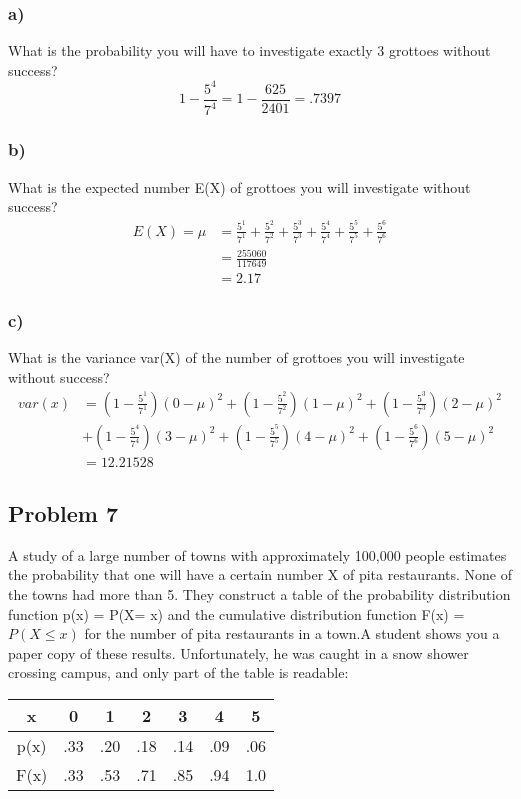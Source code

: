 \documentclass{article}
\begin{document}
\subsubsection*{a)}
What is the probability you will have to investigate exactly 3 grottoes without success?
\begin{equation}
    1 - \frac{5^{4}}{7^{4}} = 1 - \frac{625}{2401} = .7397
\end{equation}
\subsubsection*{b)}
What is the expected number E(X) of grottoes you will investigate without success?
\begin{align}
    E(X) = \mu &= \frac{5^{1}}{7^{1}} + \frac{5^{2}}{7^{2}} + \frac{5^{3}}{7^{3}} + \frac{5^{4}}{7^{4}} + \frac{5^{5}}{7^{5}} + \frac{5^{6}}{7^{6}}\\
    &= \frac{255060}{117649}\\
    &= 2.17
\end{align}
\subsubsection*{c)}
What is the variance var(X) of the number of grottoes you will investigate without success?
\begin{align}
    var(x) &= (1 - \frac{5^{1}}{7^{1}})(0-\mu)^2 +  (1 - \frac{5^{2}}{7^{2}})(1-\mu)^2 +  (1 - \frac{5^{3}}{7^{3}})(2-\mu)^2 \\&+  (1 - \frac{5^{4}}{7^{4}})(3-\mu)^2 +  (1 - \frac{5^{5}}{7^{5}})(4-\mu)^2 +  (1 - \frac{5^{6}}{7^{6}})(5-\mu)^2\\
    &= 12.21528
\end{align}
\subsection*{Problem 7}
A study of a large number of towns with approximately 100,000 people estimates the probability that one will have a certain number X of pita restaurants. None of the towns had more than 5. They construct a table of the probability distribution function p(x) = P(X= x) and the cumulative distribution function F(x) = $P(X\leq x)$ for the number of pita restaurants in a town.A student shows you a paper copy of these results. Unfortunately, he was caught in a snow shower crossing campus, and only part of the table is readable:
\begin{center}
    \begin{tabular}{c|c|c|c|c|c|c}
        x    & 0  & 1 & 2 & 3 & 4 & 5 \\
        \hline
        p(x) & .33 & .20 & .18 & .14 & .09 & .06 \\
        F(x) & .33 & .53 & .71 & .85 & .94 & 1.0 
    \end{tabular}
\end{center}
\end{document}

